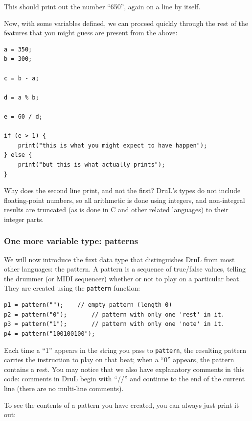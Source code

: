 This should print out the number ``650'', again on a line by itself.

Now, with some variables defined, we can proceed quickly through the rest of the features that 
you might guess are present from the above:


\begin{lstlisting}
a = 350;
b = 300;

c = b - a;

d = a % b;

e = 60 / d;

if (e > 1) {
	print("this is what you might expect to have happen");
} else {
	print("but this is what actually prints");
}

\end{lstlisting}

Why does the second line print, and not the first?  DruL's types do not include floating-point numbers, so all arithmetic is done using integers, and non-integral results are truncated (as is done in C and other related languages) to their integer parts.

\subsubsection{One more variable type: patterns}

We will now introduce the first data type that distinguishes DruL from most other languages: the pattern.  A pattern is a sequence of true/false values, telling the drummer (or MIDI sequencer) whether or not to play on a particular beat.  They are created using the {\tt pattern} function:

\begin{lstlisting}
p1 = pattern("");	 // empty pattern (length 0)
p2 = pattern("0");       // pattern with only one 'rest' in it.
p3 = pattern("1");       // pattern with only one 'note' in it.
p4 = pattern("100100100");
\end{lstlisting}

Each time a ``1'' appears in the string you pass to {\tt pattern}, the resulting pattern carries the instruction to play on that beat; when a ``0'' appears, the pattern contains a rest.
You may notice that we also have explanatory comments in this code: comments in DruL begin with ``//'' and continue to the end of the current line (there are no multi-line comments). 

To see the contents of a pattern you have created, you can always just print it out:

